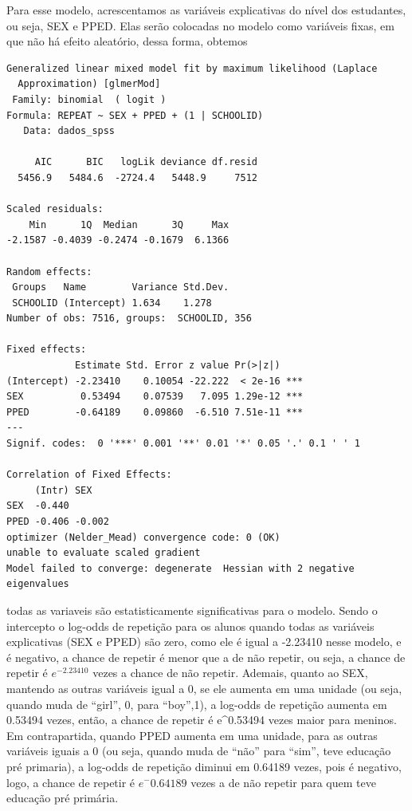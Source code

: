 \documentclass[
  letterpaper,
  DIV=11,
  numbers=noendperiod]{scrartcl}
\begin{document}
Para esse modelo, acrescentamos as variáveis explicativas do nível dos
estudantes, ou seja, SEX e PPED. Elas serão colocadas no modelo como
variáveis fixas, em que não há efeito aleatório, dessa forma, obtemos

\begin{verbatim}
Generalized linear mixed model fit by maximum likelihood (Laplace
  Approximation) [glmerMod]
 Family: binomial  ( logit )
Formula: REPEAT ~ SEX + PPED + (1 | SCHOOLID)
   Data: dados_spss

     AIC      BIC   logLik deviance df.resid 
  5456.9   5484.6  -2724.4   5448.9     7512 

Scaled residuals: 
    Min      1Q  Median      3Q     Max 
-2.1587 -0.4039 -0.2474 -0.1679  6.1366 

Random effects:
 Groups   Name        Variance Std.Dev.
 SCHOOLID (Intercept) 1.634    1.278   
Number of obs: 7516, groups:  SCHOOLID, 356

Fixed effects:
            Estimate Std. Error z value Pr(>|z|)    
(Intercept) -2.23410    0.10054 -22.222  < 2e-16 ***
SEX          0.53494    0.07539   7.095 1.29e-12 ***
PPED        -0.64189    0.09860  -6.510 7.51e-11 ***
---
Signif. codes:  0 '***' 0.001 '**' 0.01 '*' 0.05 '.' 0.1 ' ' 1

Correlation of Fixed Effects:
     (Intr) SEX   
SEX  -0.440       
PPED -0.406 -0.002
optimizer (Nelder_Mead) convergence code: 0 (OK)
unable to evaluate scaled gradient
Model failed to converge: degenerate  Hessian with 2 negative eigenvalues
\end{verbatim}

todas as variaveis são estatisticamente significativas para o modelo.
Sendo o intercepto o log-odds de repetição para os alunos quando todas
as variáveis explicativas (SEX e PPED) são zero, como ele é igual a
-2.23410 nesse modelo, e é negativo, a chance de repetir é menor que a
de não repetir, ou seja, a chance de repetir é \(e^{-2.23410}\) vezes a
chance de não repetir. Ademais, quanto ao SEX, mantendo as outras
variáveis igual a 0, se ele aumenta em uma unidade (ou seja, quando muda
de ``girl'', 0, para ``boy'',1), a log-odds de repetição aumenta em
0.53494 vezes, então, a chance de repetir é e\^{}0.53494 vezes maior
para meninos. Em contrapartida, quando PPED aumenta em uma unidade, para
as outras variáveis iguais a 0 (ou seja, quando muda de ``não'' para
``sim'', teve educação pré primaria), a log-odds de repetição diminui em
0.64189 vezes, pois é negativo, logo, a chance de repetir é
\(e^-0.64189\) vezes a de não repetir para quem teve educação pré
primária.
\end{document}
